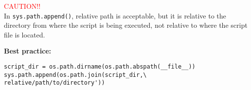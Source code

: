 \begin{mdframed}[backgroundcolor=magenta!10,linecolor=magenta]
    \vspace{6pt}
    \textcolor{red}{CAUTION!!}\\
    \vspace{1pt}
    In \texttt{sys.path.append()}, relative path is acceptable, but it is relative to the directory from where the script is being executed, not relative to where the script file is located.\\

\end{mdframed}
\begin{mdframed}[backgroundcolor=magenta!10,linecolor=magenta]

    \textbf{Best practice:}\\
    \vspace{-16pt}
        \begin{verbatim}
script_dir = os.path.dirname(os.path.abspath(__file__))
sys.path.append(os.path.join(script_dir,\
relative/path/to/directory'))
        \end{verbatim}
\end{mdframed}

